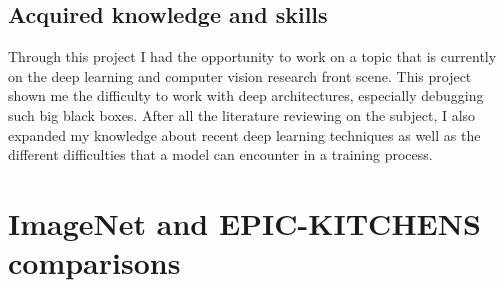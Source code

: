 \documentclass[12pt, a4paper]{report}
\begin{document}
		\section*{Acquired knowledge and skills}
			Through this project I had the opportunity to work on a topic that is currently on the deep learning and computer vision research front scene.
			This project shown me the difficulty to work with deep architectures, especially debugging such big black boxes.
			After all the literature reviewing on the subject, I also expanded my knowledge about recent deep learning techniques as well as the different difficulties that a model can encounter in a training process.

	
	
	\appendix
	\chapter{ImageNet and EPIC-KITCHENS comparisons}\label{appendix_a}
\end{document}
